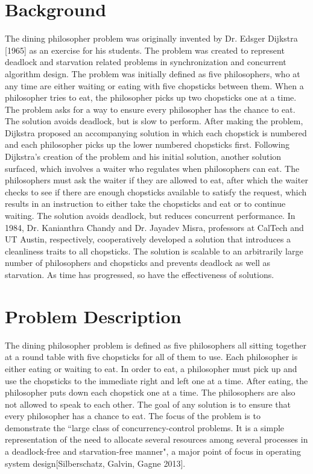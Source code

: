 \documentclass{article}
\begin{document}
\section{Background} The dining philosopher problem was originally invented by Dr. Edsger Dijkstra [1965] as an exercise for his students. The problem was created to represent deadlock and starvation related problems in synchronization and concurrent algorithm design. The problem was initially defined as five philosophers, who at any time are either waiting or eating with five chopsticks between them. When a philosopher tries to eat, the philosopher picks up two chopsticks one at a time. The problem asks for a way to ensure every philosopher has the chance to eat. The solution avoids deadlock, but is slow to perform. After making the problem, Dijkstra proposed an accompanying solution in which each chopstick is numbered and each philosopher picks up the lower numbered chopsticks first. Following Dijkstra's creation of the problem and his initial solution, another solution surfaced, which involves a waiter who regulates when philosophers can eat. The philosophers must ask the waiter if they are allowed to eat, after which the waiter checks to see if there are enough chopsticks available to satisfy the request, which results in an instruction to either take the chopsticks and eat or to continue waiting. The solution avoids deadlock, but reduces concurrent performance. In 1984, Dr. Kanianthra Chandy and Dr. Jayadev Misra, professors at CalTech and UT Austin, respectively, cooperatively developed a solution that introduces a cleanliness traits to all chopsticks. The solution is scalable to an arbitrarily large number of philosophers and chopsticks and prevents deadlock as well as starvation. As time has progressed, so have the effectiveness of solutions.

\section{Problem Description} The dining philosopher problem is defined as five philosophers all sitting together at a round table with five chopsticks for all of them to use. Each philosopher is either eating or waiting to eat. In order to eat, a philosopher must pick up and use the chopsticks to the immediate right and left one at a time. After eating, the philosopher puts down each chopstick one at a time. The philosophers are also not allowed to speak to each other. The goal of any solution is to ensure that every philosopher has a chance to eat. The focus of the problem is to demonstrate the ``large class of concurrency-control problems. It is a simple representation of the need to allocate several resources among several processes in a deadlock-free and starvation-free manner", a major point of focus in operating system design[Silberschatz, Galvin, Gagne 2013].
\end{document}
